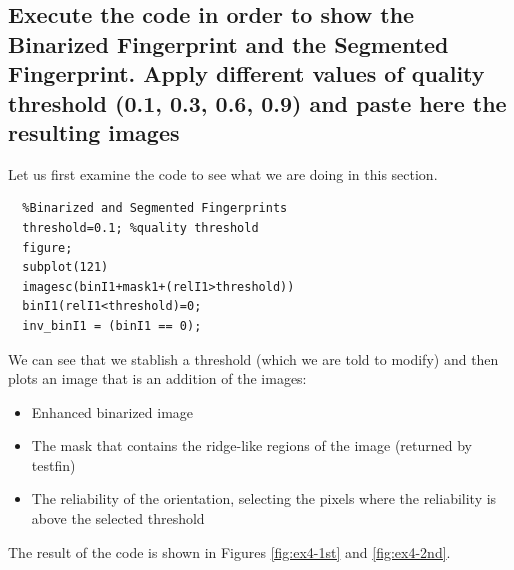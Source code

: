 \documentclass[a4paper]{article}
\begin{document}
\subsection{ Execute the code in order to show the Binarized Fingerprint and the Segmented Fingerprint. Apply different values of quality threshold (0.1, 0.3, 0.6, 0.9) and paste here the resulting images}

Let us first examine the code to see what we are doing in this section.

\begin{verbatim}
  %Binarized and Segmented Fingerprints
  threshold=0.1; %quality threshold
  figure;
  subplot(121)
  imagesc(binI1+mask1+(relI1>threshold)) 
  binI1(relI1<threshold)=0; 
  inv_binI1 = (binI1 == 0); 
\end{verbatim}

We can see that we stablish a threshold (which we are told to modify) and then plots an image that is an addition of the images:
\begin{itemize}
\item Enhanced binarized image
\item The mask that contains the ridge-like regions of the image (returned by testfin)
\item The reliability of the orientation, selecting the pixels where the reliability is above the selected threshold
\end{itemize}

The result of the code is shown in Figures \ref{fig:ex4-1st} and \ref{fig:ex4-2nd}.
\end{document}
